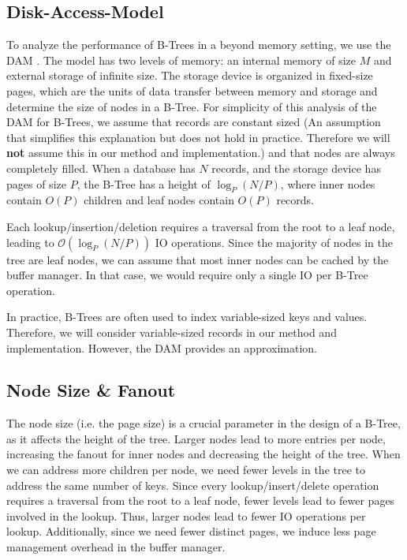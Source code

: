 \subsection*{Disk-Access-Model}
To analyze the performance of B-Trees in a beyond memory setting, we use the \ac{DAM} \cite{aggarwal1988complexity} \cite{kuszmaul2014fractal}.
The model has two levels of memory: an internal memory of size $M$ and external storage of infinite size.
The storage device is organized in fixed-size pages, which are the units of data transfer between memory and storage and determine the size of nodes in a B-Tree.
For simplicity of this analysis of the \ac{DAM} for B-Trees, we assume that records are constant sized (An assumption that simplifies this explanation but does not hold in practice. 
Therefore we will \textbf{not} assume this in our method and implementation.) and that nodes are always completely filled.
When a database has $N$ records, and the storage device has pages of size $P$, the B-Tree has a height of $\log_P(N/P)$, where inner nodes contain $O(P)$ children and leaf nodes contain $O(P)$ records.

Each lookup/insertion/deletion requires a traversal from the root to a leaf node, leading to $\mathcal{O}(\log_P(N/P))$ \ac{IO} operations.
Since the majority of nodes in the tree are leaf nodes, we can assume that most inner nodes can be cached by the buffer manager.
In that case, we would require only a single \ac{IO} per B-Tree operation.

In practice, B-Trees are often used to index variable-sized keys and values.
Therefore, we will consider variable-sized records in our method and implementation.
However, the \ac{DAM} provides an approximation.


\subsection*{Node Size \& Fanout}
\label{sec:node-size-fanout}
The node size (i.e. the page size) is a crucial parameter in the design of a B-Tree, as it affects the height of the tree.
Larger nodes lead to more entries per node, increasing the fanout for inner nodes and decreasing the height of the tree.
When we can address more children per node, we need fewer levels in the tree to address the same number of keys.
Since every lookup/insert/delete operation requires a traversal from the root to a leaf node, fewer levels lead to fewer pages involved in the lookup.
Thus, larger nodes lead to fewer \ac{IO} operations per lookup.
Additionally, since we need fewer distinct pages, we induce less page management overhead in the buffer manager.

